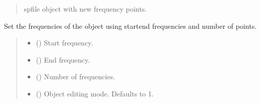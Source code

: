 \documentclass[letterpaper,10pt,english]{sphinxmanual}
\begin{document}
\begin{fulllineitems}
\begin{fulllineitems}
\begin{quote}
\begin{description}
\begin{itemize}
\end{itemize}

\sphinxAtStartPar
spfile object with new frequency points.

\sphinxAtStartPar
{\hyperref[\detokenize{touchstone:touchstone.spfile}]{}}

\end{description}\end{quote}

\end{fulllineitems}


\begin{fulllineitems}
\label{\detokenize{touchstone:touchstone.spfile.set_frequency_points_array}}
\pysigstartsignatures
{}
\pysigstopsignatures
\sphinxAtStartPar
Set the frequencies of the object using start\sphinxhyphen{}end frequencies and number of points.
\begin{quote}\begin{description}
\begin{itemize}
\item {}
\sphinxAtStartPar
{} (\sphinxstyleliteralemphasis{\sphinxupquote{{[}}}\sphinxstyleliteralemphasis{\sphinxupquote{{]}}}) \textendash{} Start frequency.

\item {}
\sphinxAtStartPar
{} (\sphinxstyleliteralemphasis{\sphinxupquote{{[}}}\sphinxstyleliteralemphasis{\sphinxupquote{{]}}}) \textendash{} End frequency.

\item {}
\sphinxAtStartPar
{} () \textendash{} Number of frequencies.

\item {}
\sphinxAtStartPar
{} (\sphinxstyleliteralemphasis{\sphinxupquote{, }}) \textendash{} Object editing mode. Defaults to \sphinxhyphen{}1.


\end{itemize}
\end{description}
\end{quote}
\end{fulllineitems}
\end{fulllineitems}
\end{document}

